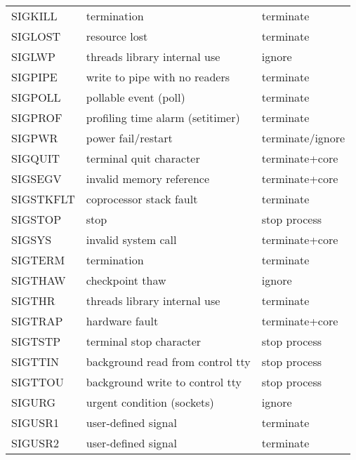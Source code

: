 \documentclass{article}
\begin{document}
\begin{table}[h!]
\begin{center}
\begin{tabular}[h!]{|l | l | l|}
        SIGKILL 	& termination 		                   & terminate             \\
        SIGLOST 	& resource lost 					   & terminate             \\
        SIGLWP 	    & threads library internal use 		   & ignore                \\
        SIGPIPE 	& write to pipe with no readers 	   & terminate             \\
        SIGPOLL 	& pollable event (poll) 			   & terminate             \\
        SIGPROF 	& profiling time alarm (setitimer) 	   & terminate             \\
        SIGPWR 	    & power fail/restart 				   & terminate/ignore      \\
        SIGQUIT 	& terminal quit character 		       & terminate+core        \\
        SIGSEGV 	& invalid memory reference 	           & terminate+core        \\
        SIGSTKFLT   & coprocessor stack fault 		       & terminate             \\
        SIGSTOP 	& stop 		                           & stop process          \\
        SIGSYS 	    & invalid system call 		           & terminate+core        \\
        SIGTERM 	& termination 	                       & terminate             \\
        SIGTHAW 	& checkpoint thaw 					   & ignore                \\
        SIGTHR 	    & threads library internal use 		   & terminate             \\
        SIGTRAP 	& hardware fault 		               & terminate+core        \\
        SIGTSTP 	& terminal stop character 		       & stop process          \\
        SIGTTIN 	& background read from control tty 	   & stop process          \\
        SIGTTOU 	& background write to control tty 	   & stop process          \\
        SIGURG 	    & urgent condition (sockets) 		   & ignore                \\
        SIGUSR1 	& user-defined signal 		           & terminate             \\
        SIGUSR2 	& user-defined signal 		           & terminate             \\

\end{tabular}
\end{center}
\end{table}
\end{document}
